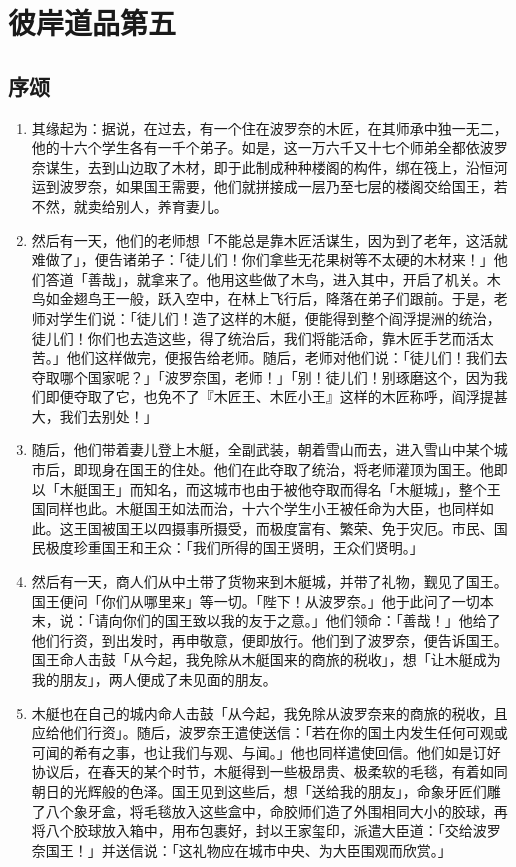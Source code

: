 \chapter{彼岸道品第五}

\section{序颂}

\begin{enumerate}\item 其缘起为：据说，在过去，有一个住在波罗奈的木匠，在其师承中独一无二，他的十六个学生各有一千个弟子。如是，这一万六千又十七个师弟全都依波罗奈谋生，去到山边取了木材，即于此制成种种楼阁的构件，绑在筏上，沿恒河运到波罗奈，如果国王需要，他们就拼接成一层乃至七层的楼阁交给国王，若不然，就卖给别人，养育妻儿。
\item 然后有一天，他们的老师想「不能总是靠木匠活谋生，因为到了老年，这活就难做了」，便告诸弟子：「徒儿们！你们拿些无花果树等不太硬的木材来！」他们答道「善哉」，就拿来了。他用这些做了木鸟，进入其中，开启了机关。木鸟如金翅鸟王一般，跃入空中，在林上飞行后，降落在弟子们跟前。于是，老师对学生们说：「徒儿们！造了这样的木艇，便能得到整个阎浮提洲的统治，徒儿们！你们也去造这些，得了统治后，我们将能活命，靠木匠手艺而活太苦。」他们这样做完，便报告给老师。随后，老师对他们说：「徒儿们！我们去夺取哪个国家呢？」「波罗奈国，老师！」「别！徒儿们！别琢磨这个，因为我们即便夺取了它，也免不了『木匠王、木匠小王』这样的木匠称呼，阎浮提甚大，我们去别处！」
\item 随后，他们带着妻儿登上木艇，全副武装，朝着雪山而去，进入雪山中某个城市后，即现身在国王的住处。他们在此夺取了统治，将老师灌顶为国王。他即以「木艇国王」而知名，而这城市也由于被他夺取而得名「木艇城」，整个王国同样也此。木艇国王如法而治，十六个学生小王被任命为大臣，也同样如此。这王国被国王以四摄事所摄受，而极度富有、繁荣、免于灾厄。市民、国民极度珍重国王和王众：「我们所得的国王贤明，王众们贤明。」
\item 然后有一天，商人们从中土带了货物来到木艇城，并带了礼物，觐见了国王。国王便问「你们从哪里来」等一切。「陛下！从波罗奈。」他于此问了一切本末，说：「请向你们的国王致以我的友于之意。」他们领命：「善哉！」他给了他们行资，到出发时，再申敬意，便即放行。他们到了波罗奈，便告诉国王。国王命人击鼓「从今起，我免除从木艇国来的商旅的税收」，想「让木艇成为我的朋友」，两人便成了未见面的朋友。
\item 木艇也在自己的城内命人击鼓「从今起，我免除从波罗奈来的商旅的税收，且应给他们行资」。随后，波罗奈王遣使送信：「若在你的国土内发生任何可观或可闻的希有之事，也让我们与观、与闻。」他也同样遣使回信。他们如是订好协议后，在春天的某个时节，木艇得到一些极昂贵、极柔软的毛毯，有着如同朝日的光辉般的色泽。国王见到这些后，想「送给我的朋友」，命象牙匠们雕了八个象牙盒，将毛毯放入这些盒中，命胶师们造了外围相同大小的胶球，再将八个胶球放入箱中，用布包裹好，封以王家玺印，派遣大臣道：「交给波罗奈国王！」并送信说：「这礼物应在城市中央、为大臣围观而欣赏。」

\end{enumerate}
